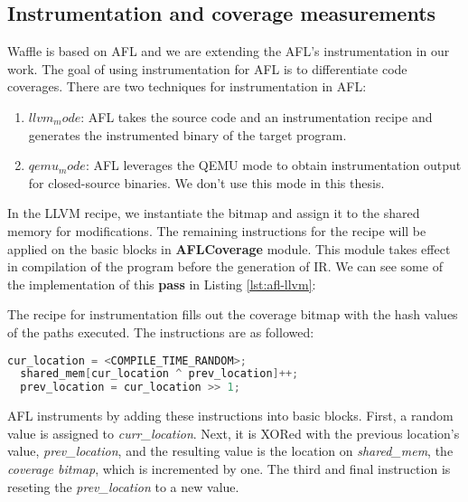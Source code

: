 \subsection{Instrumentation and coverage measurements}
\label{instrumentation}

Waffle is based on AFL and we are extending the AFL's instrumentation in our work. The goal of using instrumentation for AFL is to differentiate code coverages. There are two techniques for instrumentation in AFL:

\begin{enumerate}
  \item \textit{$llvm_mode$}: AFL takes the source code and an instrumentation recipe and generates the instrumented binary of the target program.
  \item \textit{$qemu_mode$}: AFL leverages the QEMU mode to obtain instrumentation output for closed-source binaries. We don't use this mode in this thesis.
\end{enumerate}

In the LLVM recipe, we instantiate the bitmap and assign it to the shared memory for modifications. The remaining instructions for the recipe will be applied on the basic blocks in \textbf{AFLCoverage} module. This module takes effect in compilation of the program before the generation of IR. We can see some of the implementation of this \textbf{pass} in Listing \ref{lst:afl-llvm}:



The recipe for instrumentation fills out the coverage bitmap with the hash values of the paths executed. The instructions are as followed:

\begin{lstlisting}[language=C++,style=CodeStyle,label={lst:hash},caption={Select element and update in shared\_mem}]
  cur_location = <COMPILE_TIME_RANDOM>;
  shared_mem[cur_location ^ prev_location]++; 
  prev_location = cur_location >> 1;
\end{lstlisting}

AFL instruments by adding these instructions into basic blocks. First, a random value is assigned to \textit{curr\_location}. Next, it is XORed with the previous location's value, \textit{prev\_location}, and the resulting value is the location on \textit{shared\_mem}, the \textit{coverage bitmap}, which is incremented by one. The third and final instruction is reseting the \textit{prev\_location} to a new value.

